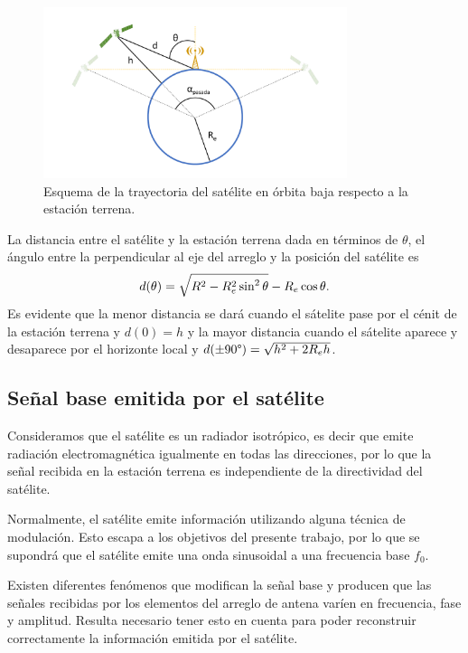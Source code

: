 \documentclass{article}
\newenvironment{standalone}{\begin{preview}}{\end{preview}}
\begin{document}
\begin{standalone}
  \begin{figure}[!htbp]
    \centering
    \includegraphics[trim=90pt 40pt 90pt 40pt, clip, width=\linewidth, height=50mm, keepaspectratio]{../images/movimiento-satelite.pdf}
    \caption{Esquema de la trayectoria del satélite en órbita baja respecto a la estación terrena.}
    \label{fig:esquema_satelite_antena}
  \end{figure}

  La distancia entre el satélite y la estación terrena dada en términos de $\theta$, el ángulo entre la perpendicular al eje del arreglo y la posición del satélite es \cite{popescu2016}
  \begin{equation}
    d(\theta) = \sqrt{ R^2 - R_e^2  \sin^2{\theta} } - R_e \cos{\theta}.
    \tagaddtext{[\si{\meter}]}
  \end{equation}
  Es evidente que la menor distancia se dará cuando el sátelite pase por el cénit de la estación terrena y $d(0) = h$ y la mayor distancia cuando el sátelite aparece y desaparece por el horizonte local y $d(\pm 90 \degree) = \sqrt{ h^2 + 2 R_e h }$.

  \subsection{Señal base emitida por el satélite}

  Consideramos que el satélite es un radiador isotrópico, es decir que emite radiación electromagnética igualmente en todas las direcciones, por lo que la señal recibida en la estación terrena es independiente de la directividad del satélite. 

  Normalmente, el satélite emite información utilizando alguna técnica de modulación. Esto escapa a los objetivos del presente trabajo, por lo que se supondrá que el satélite emite una onda sinusoidal a una frecuencia base $f_0$.

  Existen diferentes fenómenos que modifican la señal base y producen que las señales recibidas por los elementos del arreglo de antena varíen en frecuencia, fase y amplitud.
  Resulta necesario tener esto en cuenta para poder reconstruir correctamente la información emitida por el satélite.


\end{standalone}
\end{document}
